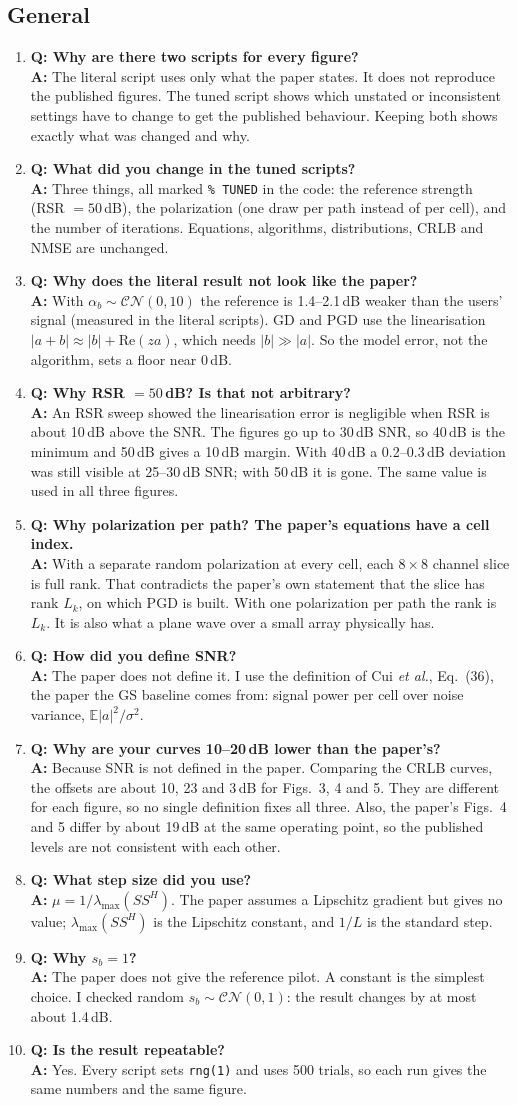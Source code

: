\documentclass[11pt,a4paper]{article}
\newcommand{\file}[1]{\texttt{#1}}
\newcommand{\E}{\mathbb{E}}
\newcommand{\QA}[2]{\item \textbf{Q: #1}\\ \textbf{A:} #2}
\begin{document}
\subsection*{General}
\begin{enumerate}[leftmargin=*,itemsep=4pt]
\QA{Why are there two scripts for every figure?}
   {The literal script uses only what the paper states. It does not reproduce the published
    figures. The tuned script shows which unstated or inconsistent settings have to change to get
    the published behaviour. Keeping both shows exactly what was changed and why.}
\QA{What did you change in the tuned scripts?}
   {Three things, all marked \file{\% TUNED} in the code: the reference strength (RSR $=50$\,dB),
    the polarization (one draw per path instead of per cell), and the number of iterations.
    Equations, algorithms, distributions, CRLB and NMSE are unchanged.}
\QA{Why does the literal result not look like the paper?}
   {With $\alpha_b\sim\mathcal{CN}(0,10)$ the reference is 1.4--2.1\,dB weaker than the users'
    signal (measured in the literal scripts). GD and PGD use the linearisation
    $|a+b|\approx|b|+\mathrm{Re}(za)$, which needs $|b|\gg|a|$. So the model error, not the
    algorithm, sets a floor near 0\,dB.}
\QA{Why RSR $=50$\,dB? Is that not arbitrary?}
   {An RSR sweep showed the linearisation error is negligible when RSR is about 10\,dB above the
    SNR. The figures go up to 30\,dB SNR, so 40\,dB is the minimum and 50\,dB gives a 10\,dB margin.
    With 40\,dB a 0.2--0.3\,dB deviation was still visible at 25--30\,dB SNR; with 50\,dB it is gone.
    The same value is used in all three figures.}
\QA{Why polarization per path? The paper's equations have a cell index.}
   {With a separate random polarization at every cell, each $8\times8$ channel slice is full rank.
    That contradicts the paper's own statement that the slice has rank $L_k$, on which PGD is
    built. With one polarization per path the rank is $L_k$. It is also what a plane wave over a
    small array physically has.}
\QA{How did you define SNR?}
   {The paper does not define it. I use the definition of Cui \emph{et al.}, Eq.~(36), the paper
    the GS baseline comes from: signal power per cell over noise variance, $\E|a|^2/\sigma^2$.}
\QA{Why are your curves 10--20\,dB lower than the paper's?}
   {Because SNR is not defined in the paper. Comparing the CRLB curves, the offsets are about 10,
    23 and 3\,dB for Figs.~3, 4 and 5. They are different for each figure, so no single definition
    fixes all three. Also, the paper's Figs.~4 and 5 differ by about 19\,dB at the same operating
    point, so the published levels are not consistent with each other.}
\QA{What step size did you use?}
   {$\mu=1/\lambda_{\max}(SS^H)$. The paper assumes a Lipschitz gradient but gives no value;
    $\lambda_{\max}(SS^H)$ is the Lipschitz constant, and $1/L$ is the standard step.}
\QA{Why $s_b=1$?}
   {The paper does not give the reference pilot. A constant is the simplest choice. I checked
    random $s_b\sim\mathcal{CN}(0,1)$: the result changes by at most about 1.4\,dB.}
\QA{Is the result repeatable?}
   {Yes. Every script sets \file{rng(1)} and uses 500 trials, so each run gives the same numbers
    and the same figure.}
\end{enumerate}
\end{document}
